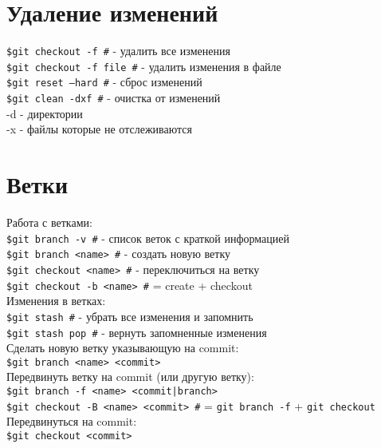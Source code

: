 \documentclass[12pt, a4paper]{article}
\begin{document}
\section{Удаление изменений}

\texttt{\$git checkout -f \indent \#} - удалить все изменения \\
\texttt{\$git checkout -f file \indent \#} - удалить изменения в файле \\
\texttt{\$git reset --hard \indent \#}  - сброс изменений \\
\texttt{\$git clean -dxf \indent \#} - очистка от изменений \\
\indent -d - директории \\
\indent -x - файлы которые не отслеживаются \\


\section{Ветки}

Работа с ветками: \\
\indent \texttt{\$git branch -v \indent \#} - список веток с краткой информацией\\
\indent \texttt{\$git branch <name> \indent \#} - создать новую ветку \\
\indent \texttt{\$git checkout <name> \indent \#} - переключиться на ветку\\
\indent \texttt{\$git checkout -b <name> \indent \#} = create + checkout \\

\noindent Изменения в ветках: \\

\indent \texttt{\$git stash \indent \#} - убрать все изменения и запомнить \\
\indent \texttt{\$git stash pop \indent \#} - вернуть запомненные изменения \\

\noindent Сделать новую ветку указывающую на commit:\\
\indent \texttt{\$git branch <name> <commit>}  \\
Передвинуть ветку на commit (или другую ветку):  \\
\indent \texttt{\$git branch -f <name> <commit|branch>} \\ 
\indent \texttt{\$git checkout -B <name> <commit> \indent \#}  = \texttt{git branch -f}  + \texttt{git checkout} \\
Передвинуться на commit:\\
\indent \texttt{\$git checkout <commit>} \\
\end{document}
